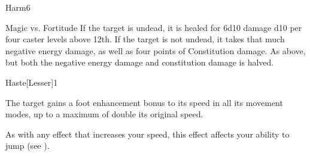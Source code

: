 \begin{spellsection}{Harm}{6}
\begin{spellheader}
\end{spellheader}
\begin{spellcontent}
    \begin{spelltargetinginfo}
    \end{spelltargetinginfo}
    \begin{spelleffects}
        \begin{spellattack}{Magic vs. Fortitude}
            \spelleffect If the target is undead, it is healed for 6d10 damage \add d10 per four caster levels above 12th.
            \spellsuccess If the target is not undead, it takes that much negative energy damage, as well as four points of Constitution damage.
            \spellfailure As above, but both the negative energy damage and constitution damage is halved.
        \end{spellattack}
    \end{spelleffects}
\end{spellcontent}
\begin{spellfooter}
\end{spellfooter}
\end{spellsection}

\begin{spellsection}{Haste}[Lesser]{1}
\begin{spellheader}
\end{spellheader}
\begin{spellcontent}
    \begin{spelltargetinginfo}
    \end{spelltargetinginfo}
    \begin{spelleffects}
        \spelleffect The target gains a  foot enhancement bonus to its speed in all its movement modes, up to a maximum of double its original speed.
        \spelldur \durshort \dismissable
    \end{spelleffects}
\end{spellcontent}
\begin{spellfooter}
    \spellnotes As with any effect that increases your speed, this effect affects your ability to jump (see ).
\end{spellfooter}
\end{spellsection}

